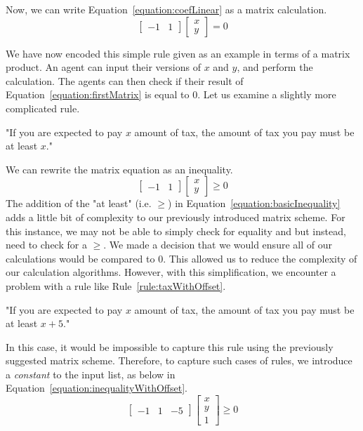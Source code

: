 Now, we can write Equation~\eqref{equation:coefLinear} as a matrix calculation.
\begin{equation}
    \begin{bmatrix}
        -1 & 1
    \end{bmatrix}
    \begin{bmatrix}
        x \\
        y
    \end{bmatrix}   
    = 0  
    \label{equation:firstMatrix}
\end{equation}

We have now encoded this simple rule given as an example in terms of a matrix product. An agent can input their versions of $x$ and $y$, and perform the calculation.
The agents can then check if their result of Equation~\eqref{equation:firstMatrix} is equal to $0$. Let us examine a slightly more complicated rule. \\
\begin{rule_IIGO}
    "If you are expected to pay $x$ amount of tax, the amount of tax you pay must be at least $x$."
\end{rule_IIGO}

We can rewrite the matrix equation as an inequality.
\begin{equation}
    \begin{bmatrix}
        -1 & 1
    \end{bmatrix}
    \begin{bmatrix}
        x \\
        y
    \end{bmatrix}   
    \geq 0
    \label{equation:basicInequality}  
\end{equation}
The addition of the "at least" (i.e. $\geq$) in Equation~\eqref{equation:basicInequality} adds a little bit of complexity to our previously introduced matrix scheme. For this instance, we may not be able to simply check for equality and but instead, need to check for a $\geq$.
We made a decision that we would ensure all of our calculations would be compared to $0$. This allowed us to reduce the complexity of our calculation algorithms.
However, with this simplification, we encounter a problem with a rule like Rule~\ref{rule:taxWithOffset}.
\begin{rule_IIGO}
    "If you are expected to pay $x$ amount of tax, the amount of tax you pay must be at least $x + 5$."
    \label{rule:taxWithOffset}
\end{rule_IIGO}
In this case, it would be impossible to capture this rule using the previously suggested matrix scheme. Therefore, to capture such cases of rules, we introduce a \emph{constant} to the input list, as below in Equation~\eqref{equation:inequalityWithOffset}.
\begin{equation}
    \begin{bmatrix}
        -1 & 1 & -5
    \end{bmatrix}
    \begin{bmatrix}
        x \\
        y \\
        1
    \end{bmatrix}   
    \geq 0 
    \label{equation:inequalityWithOffset} 
\end{equation}

